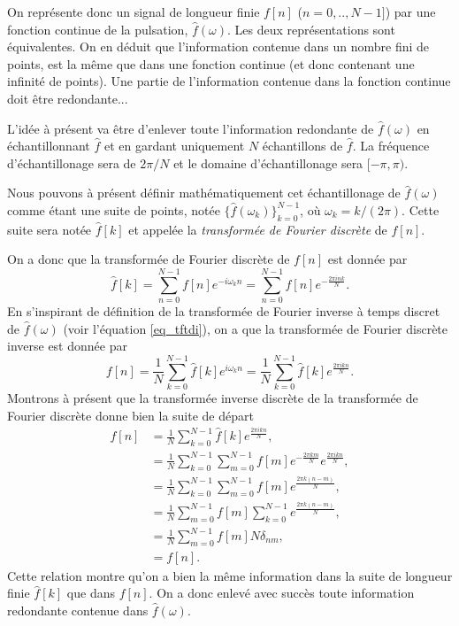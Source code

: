 \documentclass[a4paper,12pt]{book}
\newcommand{\fh}{\hat{f}}
\begin{document}
On représente donc un signal de longueur finie $f[n]$ ($n=0,..,N-1]$) par une fonction
continue de la pulsation, $\fh(\omega)$. Les deux représentations sont équivalentes. On en
déduit que l'information contenue dans un nombre fini de points, est la même que dans une
fonction continue (et donc contenant une infinité de points). 
Une partie de l'information contenue dans la fonction continue doit être redondante...

L'idée à présent va être d'enlever toute l'information redondante de $\fh(\omega)$ en
échantillonnant $\fh$ et en gardant uniquement $N$ échantillons de $\fh$. La fréquence 
d'échantillonage sera de $2\pi/N$ et le domaine d'échantillonage sera $[-\pi,\pi)$.

Nous pouvons à présent définir mathématiquement cet échantillonage de $\fh(\omega)$ comme
étant une suite de points, notée $\{\fh(\omega_k)\}_{k=0}^{N-1}$, où $\omega_k=k/(2\pi)$.
Cette suite sera notée $\fh[k]$ et appelée la \textit{transformée de Fourier discrète} de
$f[n]$.

On a donc que la transformée de Fourier discrète de $f[n]$ est donnée par
\begin{equation}
 \fh[k]=\sum_{n=0}^{N-1} f[n] e^{-i\omega_k n}
       =\sum_{n=0}^{N-1} f[n] e^{-\frac{2\pi i n k}{N}}.\label{eq_tfd}
\end{equation}
En s'inspirant de définition de la transformée de Fourier inverse à temps discret de
$\fh(\omega)$ (voir l'équation \eqref{eq_tftdi}), on a que la transformée de Fourier
discrète inverse est donnée par
\begin{equation}
 f[n]=\frac{1}{N}\sum_{k=0}^{N-1} \fh[k] e^{i\omega_k n}
 =\frac{1}{N}\sum_{k=0}^{N-1} \fh[k] e^{\frac{2\pi i k n}{N}}.
\end{equation}
Montrons à présent que la transformée inverse discrète de la transformée de Fourier 
discrète donne bien la suite de départ
\begin{align}
 f[n]&=\frac{1}{N}\sum_{k=0}^{N-1} \fh[k] e^{\frac{2\pi i k n}{N}},\nonumber\\
 &=\frac{1}{N}\sum_{k=0}^{N-1} \sum_{m=0}^{N-1} f[m] e^{-\frac{2\pi k m}{N}} e^{\frac{2\pi i k n}{N}},\nonumber\\
 &=\frac{1}{N}\sum_{k=0}^{N-1} \sum_{m=0}^{N-1} f[m] e^{\frac{2\pi k (n-m)}{N}},\nonumber\\
 &=\frac{1}{N}\sum_{m=0}^{N-1} f[m] \sum_{k=0}^{N-1} e^{\frac{2\pi k (n-m)}{N}},\nonumber\\
 &=\frac{1}{N}\sum_{m=0}^{N-1} f[m] N \delta_{nm},\nonumber\\
 &=f[n].
\end{align}
Cette relation montre qu'on a bien la même information dans la suite de longueur finie 
$\fh[k]$ que dans $f[n]$. On a donc enlevé avec succès toute information redondante contenue
dans $\fh(\omega)$. 
\end{document}
